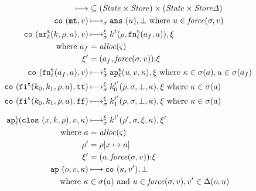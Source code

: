 \documentclass{llncs}
\begin{document}
\begin{gather*}
\begin{align*}
\machstep &\subseteq (\State \times \Store) \times (\State \times \StoreDelta) \\
\co{\kmt,\mval} &\machstep_\msto
\ans{\mvalx{u}},\bot
\text{ where } \mvalx{u} \in \spchoice{\force(\msto,\mval)}{\force(\mval)}
\\
\co{\kar[^\mcntr_\mlab]{\mcomp,\menv,\maddr},\mval} & \machstep_\msto^\msdiff
\mcomp^\mcntr(\menv,\kfn[^\mcntr_\mlab]{\maddr_f,\maddr}), \msdiff
\\
\text{ where }\maddr_f &= \alloc(\mstate) \\ 
              \msdiff' &= \cons{\ttuple{\maddr_f}{\spchoice{\force(\msto,\mval)}{\force(\mval)}}}{\msdiff}
\\
\co{\kfn[^\mcntr_\mlab]{\maddr_f,\maddr},\mval} & \machstep_\msto^\msdiff
\ap[^\mcntr_\mlab]{\mvalx{u},\mval,\mkont}, \msdiff
\text{ where } \mkont \in \msto(\maddr), \mvalx{u} \in \msto(\maddr_f)
\\
\co{\kif[^\mcntr]{\mcompi0,\mcompi1,\menv,\maddr},\strue} & \machstep_\msto^\msdiff
\mcompi0^{\mcntr'}(\menv,\msto,\bot,\mkont), \msdiff
\text{ where }\mkont\in\msto(\maddr)
\\
\co{\kif[^\mcntr]{\mcompi0,\mcompi1,\menv,\maddr},\sfalse} & \machstep_\msto^\msdiff
\mcompi1^{\mcntr'}(\menv,\msto,\bot,\mkont), \msdiff
\text{ where }\mkont\in\msto(\maddr)
\\[2mm]
\ap[^\mcntr_\mlab]{\clos{\mvar,\mcomp,\menv},\mval,\mkont} & \machstep_\msto^\msdiff
\spchoice
 {\mcomp^{\mcntr'}(\menv',\msto,\msdiff,\mkont), \msdiff'}
 {\call[^{\mcntr'}]{\mcomp,\menv',\mkont}, \msdiff'} \\
\text{ where }
\maddr &= \alloc(\mstate) \\
\menv' &= \menv[\mvar \mapsto \maddr] \\
\msdiff' &= \cons{\ttuple{\maddr}{\spchoice{\force(\msto, \mval)}{\force(\mval)}}}{\msdiff}
\spchoice
 {\\}
 {\\ \call[^\mcntr]{\mcomp,\menv,\mkont} &\machstep_\msto^\msdiff \mcomp^\mcntr(\menv,\msto,\msdiff,\mkont) \\}
\ap{\mop,\mval,\mkont} & \machstep
\co{\mkont,\mval'},\bot \\
\text{ where }\mkont &\in\msto(\maddr)
\text{ and } \mvalx{u} \in \spchoice{\force(\msto,\mval)}{\force(\mval)}, \mval'\in\interpdelta(\mop,\mvalx{u})
\end{align*}
\end{gather*}
\end{document}
